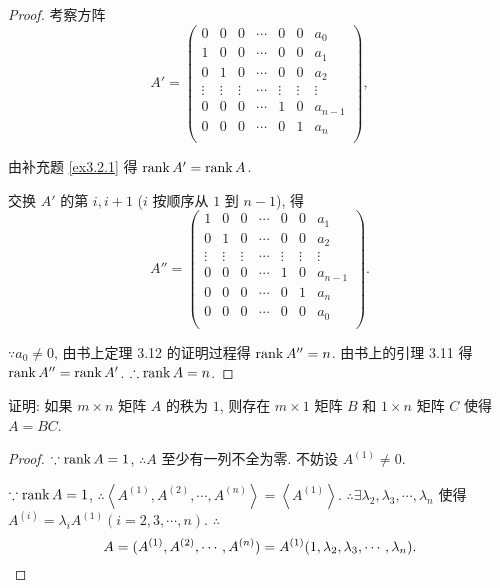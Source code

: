 \documentclass[color=black,device=normal,lang=cn,mode=geye]{elegantnote}
\begin{document}
\begin{proof}
    考察方阵
    \[A'=\begin{pmatrix}
        0 & 0 & 0 & \cdots & 0 & 0 & a_0 \\
        1 & 0 & 0 & \cdots & 0 & 0 & a_1 \\
        0 & 1 & 0 & \cdots & 0 & 0 & a_2 \\
        \vdots & \vdots & \vdots & \cdots & \vdots & \vdots & \vdots \\
        0 & 0 & 0 & \cdots & 1 & 0 & a_{n-1} \\
        0 & 0 & 0 & \cdots & 0 & 1 & a_n \\
    \end{pmatrix},\]

    由补充题 \ref{ex3.2.1} 得 $\operatorname{rank} A'=\operatorname{rank} A$.

    交换 $A'$ 的第 $i,i+1$ ($i$ 按顺序从 $1$ 到 $n-1$), 得
    \[A''=\begin{pmatrix}
        1 & 0 & 0 & \cdots & 0 & 0 & a_1 \\
        0 & 1 & 0 & \cdots & 0 & 0 & a_2 \\
        \vdots & \vdots & \vdots & \cdots & \vdots & \vdots & \vdots \\
        0 & 0 & 0 & \cdots & 1 & 0 & a_{n-1} \\
        0 & 0 & 0 & \cdots & 0 & 1 & a_n \\
        0 & 0 & 0 & \cdots & 0 & 0 & a_0 \\
    \end{pmatrix}.\]

    $\because a_0\neq0$, 由书上定理 3.12 的证明过程得 $\operatorname{rank} A''=n$. 由书上的引理 3.11 得 $\operatorname{rank} A''=\operatorname{rank} A'$. $\therefore\operatorname{rank} A=n$.
\end{proof}
\begin{exercisec}[3.3.6]\label{ex3.3.6}
    证明: 如果 $m\times n$ 矩阵 $A$ 的秩为 $1$, 则存在 $m\times1$ 矩阵 $B$ 和 $1\times n$ 矩阵 $C$ 使得 $A=BC$.
\end{exercisec}
\begin{proof}
    $\because\operatorname{rank} A=1$, $\therefore A$ 至少有一列不全为零. 不妨设 $A^{(1)}\neq0$.
    
    $\because\operatorname{rank} A=1$, $\therefore\left<A^{(1)},A^{(2)},\cdots,A^{(n)}\right>=\left<A^{(1)}\right>$. $\therefore\exists\lambda_2,\lambda_3,\cdots,\lambda_n$ 使得 $A^{(i)}=\lambda_iA^{(1)}(i=2,3,\cdots,n)$. $\therefore$
    \[A=(A^{(1)},A^{(2)},\cdots,A^{(n)})=A^{(1)}(1,\lambda_2,\lambda_3,\cdots,\lambda_n).\qedhere\]
\end{proof}
\end{document}
